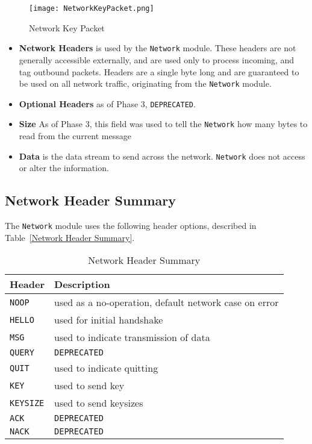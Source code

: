 \documentclass[sigconf]{acmart}
\begin{document}
\begin{figure} [htb]
	\centering
	\texttt{[image: NetworkKeyPacket.png]}
	\caption{Network Key Packet}
	\label{Network Key Packet}
\end{figure}

\begin{itemize}
	\item \textbf{Network Headers} is used by the \texttt{Network} module. These headers are not
	      generally accessible externally, and are used only to process incoming, and tag
	      outbound packets. Headers are a single byte long and are guaranteed to be used on all
	      network traffic, originating from the \texttt{Network} module.
	\item \textbf{Optional Headers} as of Phase 3, \texttt{DEPRECATED}.
	\item \textbf{Size} As of Phase 3, this field was used to tell the \texttt{Network} how many
	      bytes to read from the current message
	\item \textbf{Data} is the data stream to send across the network. \texttt{Network} does not
	      access or alter the information.
\end{itemize}

\subsection{Network Header Summary}
The \texttt{Network} module uses the following header options, described in Table~\ref{Network
Header Summary}.
\begin{table}[htb]
	\centering
	\caption{Network Header Summary}
	\label{Network Header Summary}

	\begin{tabular}{|p{4em}|p{20em}|} \hline
		\textbf{Header}  & \textbf{Description}                                  \\ \hline
		\texttt{NOOP}    & used as a no-operation, default network case on error \\ \hline
		\texttt{HELLO}   & used for initial handshake                            \\ \hline
		\texttt{MSG}     & used to indicate transmission of data                 \\ \hline
		\texttt{QUERY}   & \texttt{DEPRECATED}                                   \\ \hline
		\texttt{QUIT}    & used to indicate quitting                             \\ \hline
		\texttt{KEY}     & used to send key                                      \\ \hline
		\texttt{KEYSIZE} & used to send keysizes                                 \\ \hline
		\texttt{ACK}     & \texttt{DEPRECATED}                                   \\ \hline
		\texttt{NACK}    & \texttt{DEPRECATED}                                   \\ \hline
	\end{tabular}
\end{table}
\newline
\end{document}
